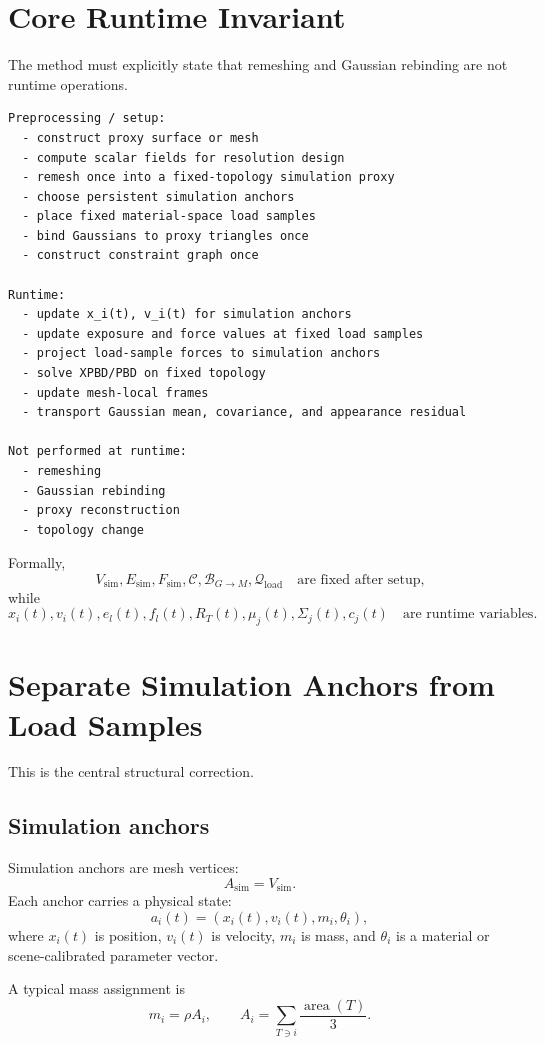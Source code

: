 \documentclass[11pt,a4paper]{article}
\begin{document}
\section{Core Runtime Invariant}

The method must explicitly state that remeshing and Gaussian rebinding are not runtime operations.

\begin{lstlisting}
Preprocessing / setup:
  - construct proxy surface or mesh
  - compute scalar fields for resolution design
  - remesh once into a fixed-topology simulation proxy
  - choose persistent simulation anchors
  - place fixed material-space load samples
  - bind Gaussians to proxy triangles once
  - construct constraint graph once

Runtime:
  - update x_i(t), v_i(t) for simulation anchors
  - update exposure and force values at fixed load samples
  - project load-sample forces to simulation anchors
  - solve XPBD/PBD on fixed topology
  - update mesh-local frames
  - transport Gaussian mean, covariance, and appearance residual

Not performed at runtime:
  - remeshing
  - Gaussian rebinding
  - proxy reconstruction
  - topology change
\end{lstlisting}

Formally,
\[
V_{\mathrm{sim}},E_{\mathrm{sim}},F_{\mathrm{sim}},\mathcal{C},\mathcal{B}_{G\rightarrow M},\mathcal{Q}_{\mathrm{load}}
\quad\text{are fixed after setup,}
\]
while
\[
x_i(t),v_i(t),e_l(t),f_l(t),R_T(t),\mu_j(t),\Sigma_j(t),c_j(t)
\quad\text{are runtime variables.}
\]

\section{Separate Simulation Anchors from Load Samples}

This is the central structural correction.

\subsection{Simulation anchors}

Simulation anchors are mesh vertices:
\[
A_{\mathrm{sim}}=V_{\mathrm{sim}}.
\]
Each anchor carries a physical state:
\[
a_i(t)=\left(x_i(t),v_i(t),m_i,\theta_i\right),
\]
where $x_i(t)$ is position, $v_i(t)$ is velocity, $m_i$ is mass, and $\theta_i$ is a material or scene-calibrated parameter vector.

A typical mass assignment is
\[
m_i = \rho A_i,\qquad
A_i=\sum_{T\ni i}\frac{\operatorname{area}(T)}{3}.
\]
\end{document}
